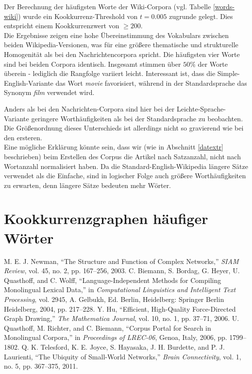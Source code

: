 \documentclass[11pt, a4paper]{article}
\begin{document}
Der Berechnung der häufigsten Worte der Wiki-Corpora (vgl. Tabelle \ref{words-wiki}) wurde ein Kookkurrenz-Threshold von $t=0.005$ zugrunde gelegt.
Dies entspricht einem Kookkurrenzwert von $\geq 200$.\\
Die Ergebnisse zeigen eine hohe Übereinstimmung des Vokabulars zwischen beiden Wikipedia-Versionen, was für eine größere thematische und strukturelle Homogenität als bei den Nachrichtencorpora spricht.
Die häufigsten vier Worte sind bei beiden Corpora identisch.
Insgesamt stimmen über $50\%$ der Worte überein - lediglich die Rangfolge variiert leicht.
Interessant ist, dass die Simple-English-Variante das Wort \textit{movie} favorisiert, während in der Standardsprache das Synonym \textit{film} verwendet wird.

Anders als bei den Nachrichten-Corpora sind hier bei der Leichte-Sprache-Variante geringere Worthäufigkeiten als bei der Standardsprache zu beobachten.
Die Größenordnung dieses Unterschieds ist allerdings nicht so gravierend wie bei den ersteren.\\
Eine mögliche Erklärung könnte sein, dass wir (wie in Abschnitt \ref{datextr} beschrieben) beim Erstellen des Corpus die Artikel nach Satzanzahl, nicht nach Wortanzahl normalisiert haben.
Da die Standard-English-Wikipedia längere Sätze verwendet als die Einfache, sind in logischer Folge auch größere Worthäufigkeiten zu erwarten, denn längere Sätze bedeuten mehr Wörter.



\section{Kookkurrenzgraphen häufiger Wörter}

\newpage
\begin{thebibliography}{9}
     M. E. J. Newman, “The Structure and Function of Complex Networks,” \emph{SIAM Review}, vol. 45, no. 2, pp. 167–256, 2003.
     C. Biemann, S. Bordag, G. Heyer, U. Quasthoff, and C. Wolff, “Language-Independent Methods for Compiling Monolingual Lexical Data,” in \emph{Computational Linguistics and Intelligent Text Processing}, vol. 2945, A. Gelbukh, Ed. Berlin, Heidelberg: Springer Berlin Heidelberg, 2004, pp. 217–228.
     Y. Hu, “Efficient, High-Quality Force-Directed Graph Drawing,” \emph{The Mathematica Journal}, vol. 10, no. 1, pp. 37–71, 2006.
    U. Quasthoff, M. Richter, and C. Biemann, “Corpus Portal for Search in Monolingual Corpora,” in \emph{Proceedings of LREC-06}, Genoa, Italy, 2006, pp. 1799–1802.
    Q. K. Telesford, K. E. Joyce, S. Hayasaka, J. H. Burdette, and P. J. Laurienti, “The Ubiquity of Small-World Networks,” \emph{Brain Connectivity}, vol. 1, no. 5, pp. 367–375, 2011.

\end{thebibliography}

\listoftables

\listoffigures
\end{document}
